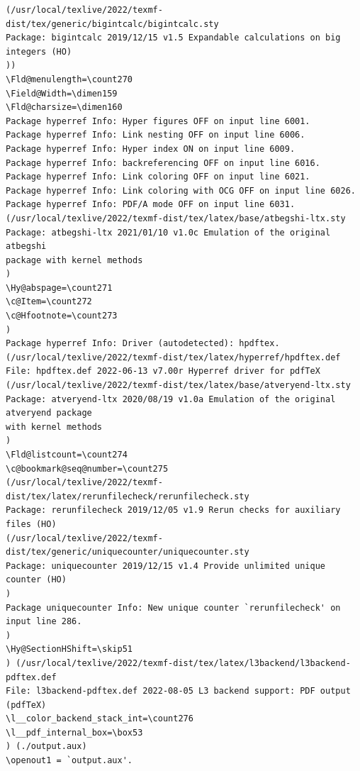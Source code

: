 \documentclass{article}
\begin{document}
\begin{verbatim}
(/usr/local/texlive/2022/texmf-dist/tex/generic/bigintcalc/bigintcalc.sty
Package: bigintcalc 2019/12/15 v1.5 Expandable calculations on big integers (HO)
))
\Fld@menulength=\count270
\Field@Width=\dimen159
\Fld@charsize=\dimen160
Package hyperref Info: Hyper figures OFF on input line 6001.
Package hyperref Info: Link nesting OFF on input line 6006.
Package hyperref Info: Hyper index ON on input line 6009.
Package hyperref Info: backreferencing OFF on input line 6016.
Package hyperref Info: Link coloring OFF on input line 6021.
Package hyperref Info: Link coloring with OCG OFF on input line 6026.
Package hyperref Info: PDF/A mode OFF on input line 6031.
(/usr/local/texlive/2022/texmf-dist/tex/latex/base/atbegshi-ltx.sty
Package: atbegshi-ltx 2021/01/10 v1.0c Emulation of the original atbegshi
package with kernel methods
)
\Hy@abspage=\count271
\c@Item=\count272
\c@Hfootnote=\count273
)
Package hyperref Info: Driver (autodetected): hpdftex.
(/usr/local/texlive/2022/texmf-dist/tex/latex/hyperref/hpdftex.def
File: hpdftex.def 2022-06-13 v7.00r Hyperref driver for pdfTeX
(/usr/local/texlive/2022/texmf-dist/tex/latex/base/atveryend-ltx.sty
Package: atveryend-ltx 2020/08/19 v1.0a Emulation of the original atveryend package
with kernel methods
)
\Fld@listcount=\count274
\c@bookmark@seq@number=\count275
(/usr/local/texlive/2022/texmf-dist/tex/latex/rerunfilecheck/rerunfilecheck.sty
Package: rerunfilecheck 2019/12/05 v1.9 Rerun checks for auxiliary files (HO)
(/usr/local/texlive/2022/texmf-dist/tex/generic/uniquecounter/uniquecounter.sty
Package: uniquecounter 2019/12/15 v1.4 Provide unlimited unique counter (HO)
)
Package uniquecounter Info: New unique counter `rerunfilecheck' on input line 286.
)
\Hy@SectionHShift=\skip51
) (/usr/local/texlive/2022/texmf-dist/tex/latex/l3backend/l3backend-pdftex.def
File: l3backend-pdftex.def 2022-08-05 L3 backend support: PDF output (pdfTeX)
\l__color_backend_stack_int=\count276
\l__pdf_internal_box=\box53
) (./output.aux)
\openout1 = `output.aux'.


\end{verbatim}
\end{document}
